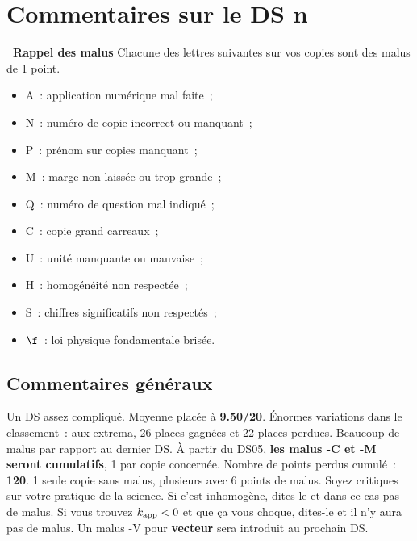 \documentclass[a4paper, 10pt, final, garamond]{book}
\begin{document}
\setcounter{chapter}{3}

\chapter{Commentaires sur le DS n}

\begin{NCprop}[width=\linewidth]{\centering\bfseries\ Rappel des malus}
    Chacune des lettres suivantes sur vos copies sont des malus de \num{1}
    point.\smallbreak
    \begin{minipage}{0.50\linewidth}
        \begin{itemize}
            \item A~: application numérique mal faite~;
            \item N~: numéro de copie incorrect ou manquant~;
            \item P~: prénom sur copies manquant~;
            \item M~: marge non laissée ou trop grande~;
            \item Q~: numéro de question mal indiqué~;
        \end{itemize}
    \end{minipage}
    \begin{minipage}{0.50\linewidth}
        \begin{itemize}
            \item C~: copie grand carreaux~;
            \item U~: unité manquante ou mauvaise~;
            \item H~: homogénéité non respectée~;
            \item S~: chiffres significatifs non respectés~;
            \item $\f$~: loi physique fondamentale brisée.
        \end{itemize}
    \end{minipage}
\end{NCprop}

\section{Commentaires généraux}

Un DS assez compliqué. Moyenne placée à \textbf{9.50/20}. Énormes variations
dans le classement~: aux extrema, 26 places gagnées et 22 places perdues.
Beaucoup de malus par rapport au dernier DS. À partir du DS05, \textbf{les malus
-C et -M seront cumulatifs}, 1 par copie concernée. Nombre de points perdus
cumulé~: \textbf{120}. 1 seule copie sans malus, plusieurs avec 6 points de
malus. Soyez critiques sur votre pratique de la science. Si c'est inhomogène,
dites-le et dans ce cas pas de malus. Si vous trouvez $k_{\rm app} < 0$ et que
ça vous choque, dites-le et il n'y aura pas de malus. Un malus -V pour
\textbf{vecteur} sera introduit au prochain DS.
\end{document}

